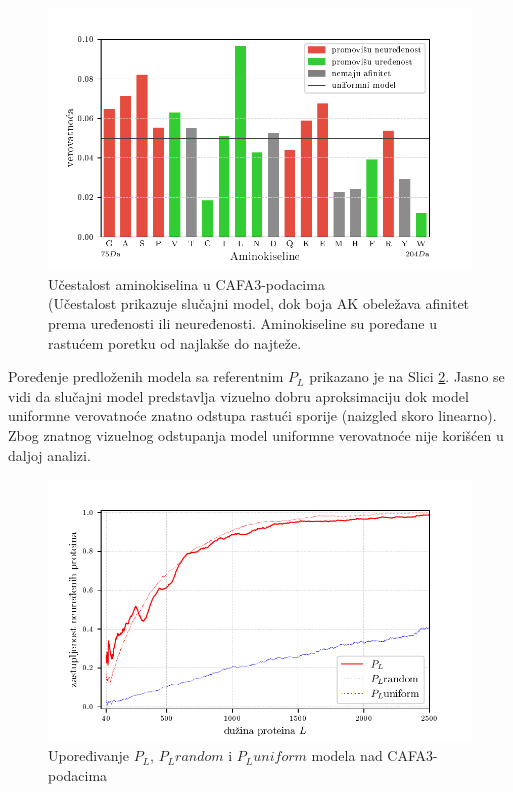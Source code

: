 \begin{figure}[th]
\centering
\includegraphics[]{plots/AK_ucestalost}
\caption{
  Učestalost aminokiselina u CAFA3-podacima
  \\ \footnotesize
  (Učestalost prikazuje slučajni model, dok boja AK obeležava afinitet prema
  uređenosti ili neuređenosti. Aminokiseline su poređane u rastućem poretku
  od najlakše do najteže. 
}
\label{fig:AK_ucestalost}
\end{figure}

Poređenje predloženih modela sa referentnim $P_L$ prikazano je na Slici
\ref{fig:PL2}. Jasno se vidi da slučajni model predstavlja vizuelno dobru
aproksimaciju dok model uniformne verovatnoće znatno odstupa rastući sporije (naizgled
skoro linearno).
Zbog znatnog vizuelnog odstupanja model uniformne verovatnoće nije korišćen u daljoj analizi.


\begin{figure}[th]
\centering
\includegraphics[]{plots/PL_F_cmp}
\caption{Upoređivanje $P_L$, $P_L random$ i $P_L uniform$ modela nad CAFA3-podacima}
\label{fig:PL2}
\end{figure}



